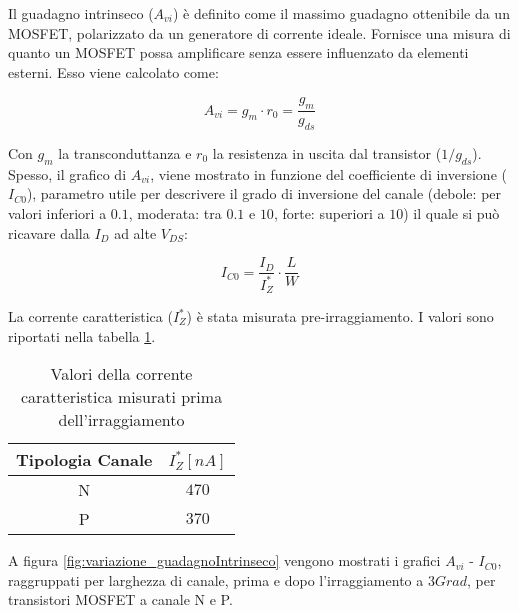 Il guadagno intrinseco ($A_{vi}$) è definito come il massimo guadagno ottenibile da un MOSFET, polarizzato da un generatore di corrente ideale.
Fornisce una misura di quanto un MOSFET possa amplificare senza essere influenzato da elementi esterni.
Esso viene calcolato come:

\begin{equation}
    A_{vi} = g_{m} \cdot r_0 = \frac{g_{m}}{g_{ds}}
\end{equation}

Con $g_m$ la transconduttanza e $r_0$ la resistenza in uscita dal transistor (${1}/{g_{ds}}$). Spesso, il grafico di $A_{vi}$, viene mostrato in funzione del coefficiente di inversione ($I_{C0}$), parametro utile per descrivere il grado di inversione del canale (debole: per valori inferiori a $0.1$, moderata: tra $0.1$ e $10$, forte: superiori a $10$) il quale si può ricavare dalla $I_D$ ad alte $V_{DS}$:

\begin{equation}
    I_{C0} = \frac{I_{D}}{I_{Z}^{*}} \cdot \frac{L}{W}
\end{equation}

La corrente caratteristica ($I_{Z}^{*}$) è stata misurata pre-irraggiamento. I valori sono riportati nella tabella \ref{tab:corrente_caratteristica}.

\begin{table}[ht]
    \centering
    \begin{tabular}{c c}
        \toprule
        Tipologia Canale & $I_{Z}^{*}[nA]$ \\
        \midrule
        N                & $470$     \\
        P                & $370$     \\
        \bottomrule
    \end{tabular}
    \caption[Valori estratti $I_z^*$]{Valori della corrente caratteristica misurati prima dell'irraggiamento}
    \label{tab:corrente_caratteristica}
\end{table}


A figura \ref{fig:variazione_guadagnoIntrinseco} vengono mostrati i grafici $A_{vi}$ - $I_{C0}$, raggruppati per larghezza di canale, prima e dopo l'irraggiamento a $3Grad$, per transistori MOSFET a canale N e P.


